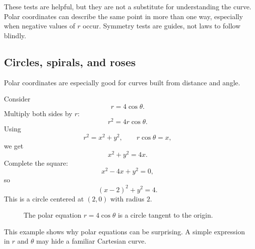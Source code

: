 These tests are helpful, but they are not a substitute for understanding the curve.  Polar
coordinates can describe the same point in more than one way, especially when negative
values of \(r\) occur.  Symmetry tests are guides, not laws to follow blindly.

\subsection{Circles, spirals, and roses}

Polar coordinates are especially good for curves built from distance and angle.

\begin{example}
Consider
\[
    r=4\cos\theta.
\]
Multiply both sides by \(r\):
\[
    r^2=4r\cos\theta.
\]
Using
\[
    r^2=x^2+y^2,
    \qquad
    r\cos\theta=x,
\]
we get
\[
    x^2+y^2=4x.
\]
Complete the square:
\[
    x^2-4x+y^2=0,
\]
so
\[
    (x-2)^2+y^2=4.
\]
This is a circle centered at \((2,0)\) with radius \(2\).

\begin{figure}[h]
\centering
{}
\caption{The polar equation \(r=4\cos\theta\) is a circle tangent to the origin.}
\end{figure}
\end{example}

This example shows why polar equations can be surprising.  A simple expression in
\(r\) and \(\theta\) may hide a familiar Cartesian curve.

